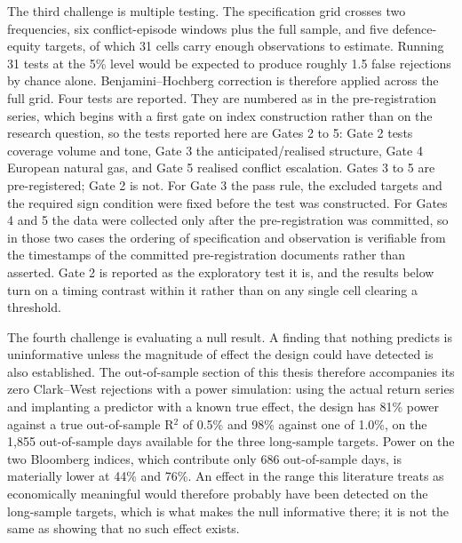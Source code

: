 \documentclass[12pt,a4paper]{article}
\begin{document}
The third challenge is multiple testing. The specification grid crosses two frequencies, six conflict-episode windows plus the full sample, and five defence-equity targets, of which 31 cells carry enough observations to estimate. Running 31 tests at the 5\% level would be expected to produce roughly 1.5 false rejections by chance alone. Benjamini--Hochberg correction is therefore applied across the full grid. Four tests are reported. They are numbered as in the pre-registration series, which begins with a first gate on index construction rather than on the research question, so the tests reported here are Gates 2 to 5: Gate 2 tests coverage volume and tone, Gate 3 the anticipated/realised structure, Gate 4 European natural gas, and Gate 5 realised conflict escalation. Gates 3 to 5 are pre-registered; Gate 2 is not. For Gate 3 the pass rule, the excluded targets and the required sign condition were fixed before the test was constructed. For Gates 4 and 5 the data were collected only after the pre-registration was committed, so in those two cases the ordering of specification and observation is verifiable from the timestamps of the committed pre-registration documents rather than asserted. Gate 2 is reported as the exploratory test it is, and the results below turn on a timing contrast within it rather than on any single cell clearing a threshold.

The fourth challenge is evaluating a null result. A finding that nothing predicts is uninformative unless the magnitude of effect the design could have detected is also established. The out-of-sample section of this thesis therefore accompanies its zero Clark--West rejections with a power simulation: using the actual return series and implanting a predictor with a known true effect, the design has 81\% power against a true out-of-sample R$^2$ of 0.5\% and 98\% against one of 1.0\%, on the 1,855 out-of-sample days available for the three long-sample targets. Power on the two Bloomberg indices, which contribute only 686 out-of-sample days, is materially lower at 44\% and 76\%. An effect in the range this literature treats as economically meaningful would therefore probably have been detected on the long-sample targets, which is what makes the null informative there; it is not the same as showing that no such effect exists.
\end{document}
